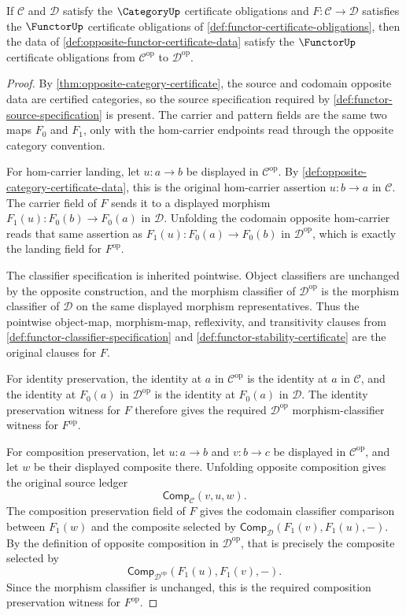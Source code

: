 \begin{theorem}
\label{thm:opposite-functor-certificate}
If $\mathcal C$ and $\mathcal D$ satisfy the $\CategoryUp$ certificate
obligations and $F:\mathcal C\to\mathcal D$ satisfies the $\FunctorUp$
certificate obligations of \autoref{def:functor-certificate-obligations}, then
the data of \autoref{def:opposite-functor-certificate-data} satisfy the
$\FunctorUp$ certificate obligations from $\mathcal C^{\mathrm{op}}$ to
$\mathcal D^{\mathrm{op}}$.
\end{theorem}
\begin{proof}
By \autoref{thm:opposite-category-certificate}, the source and codomain
opposite data are certified categories, so the source specification required by
\autoref{def:functor-source-specification} is present. The carrier and pattern
fields are the same two maps $F_0$ and $F_1$, only with the hom-carrier
endpoints read through the opposite category convention.

For hom-carrier landing, let $u:a\to b$ be displayed in
$\mathcal C^{\mathrm{op}}$. By
\autoref{def:opposite-category-certificate-data}, this is the original
hom-carrier assertion $u:b\to a$ in $\mathcal C$. The carrier field of $F$
sends it to a displayed morphism $F_1(u):F_0(b)\to F_0(a)$ in $\mathcal D$.
Unfolding the codomain opposite hom-carrier reads that same assertion as
$F_1(u):F_0(a)\to F_0(b)$ in $\mathcal D^{\mathrm{op}}$, which is exactly the
landing field for $F^{\mathrm{op}}$.

The classifier specification is inherited pointwise. Object classifiers are
unchanged by the opposite construction, and the morphism classifier of
$\mathcal D^{\mathrm{op}}$ is the morphism classifier of $\mathcal D$ on the
same displayed morphism representatives. Thus the pointwise object-map,
morphism-map, reflexivity, and transitivity clauses from
\autoref{def:functor-classifier-specification} and
\autoref{def:functor-stability-certificate} are the original clauses for $F$.

For identity preservation, the identity at $a$ in $\mathcal C^{\mathrm{op}}$
is the identity at $a$ in $\mathcal C$, and the identity at $F_0(a)$ in
$\mathcal D^{\mathrm{op}}$ is the identity at $F_0(a)$ in $\mathcal D$. The
identity preservation witness for $F$ therefore gives the required
$\mathcal D^{\mathrm{op}}$ morphism-classifier witness for $F^{\mathrm{op}}$.

For composition preservation, let $u:a\to b$ and $v:b\to c$ be displayed in
$\mathcal C^{\mathrm{op}}$, and let $w$ be their displayed composite there.
Unfolding opposite composition gives the original source ledger
$$
\mathsf{Comp}_{\mathcal C}(v,u,w).
$$
The composition preservation field of $F$ gives the codomain classifier
comparison between $F_1(w)$ and the composite selected by
$\mathsf{Comp}_{\mathcal D}(F_1(v),F_1(u),-)$. By the definition of opposite
composition in $\mathcal D^{\mathrm{op}}$, that is precisely the composite
selected by
$$
\mathsf{Comp}_{\mathcal D^{\mathrm{op}}}(F_1(u),F_1(v),-).
$$
Since the morphism classifier is unchanged, this is the required composition
preservation witness for $F^{\mathrm{op}}$.


\end{proof}
